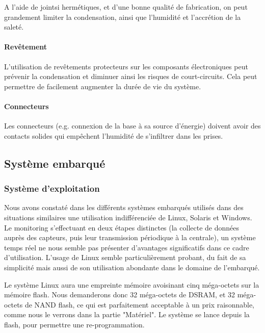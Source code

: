 A l'aide de jointsi hermétiques, et d'une bonne qualité de fabrication, on peut grandement limiter la condensation, ainsi que l'humidité et l'accrétion de la saleté.

\paragraph{Revêtement}

L'utilisation de revêtements protecteurs sur les composants électroniques peut prévenir la condensation et diminuer ainsi les risques de court-circuits. Cela peut permettre de facilement augmenter la durée de vie du système.

\paragraph{Connecteurs}

Les connecteurs (e.g. connexion de la base à sa source d'énergie) doivent avoir des contacts solides qui empêchent l'humidité de s'infiltrer dans les prises.

\subsection{Système embarqué}

\subsubsection{Système d'exploitation}

Nous avons constaté dans les différents systèmes embarqués utilisés dans des situations similaires une utilisation indifférenciée de Linux, Solaris et Windows\footnotemark. Le monitoring s'effectuant en deux étapes distinctes (la collecte de données auprès des capteurs, puis leur transmission périodique à la centrale), un système temps réel ne nous semble pas présenter d'avantages significatifs dans ce cadre d'utilisation. L'usage de Linux semble particulièrement probant, du fait de sa simplicité mais aussi de son utilisation abondante dans le domaine de l'embarqué.


Le système Linux aura une empreinte mémoire avoisinant cinq méga-octets sur la mémoire flash\footnotemark. Nous demanderons donc 32 méga-octets de DSRAM, et 32 méga-octets de NAND flash, ce qui est parfaitement acceptable à un prix raisonnable, comme nous le verrons dans la partie "Matériel". Le système se lance depuis la flash, pour permettre une re-programmation.

